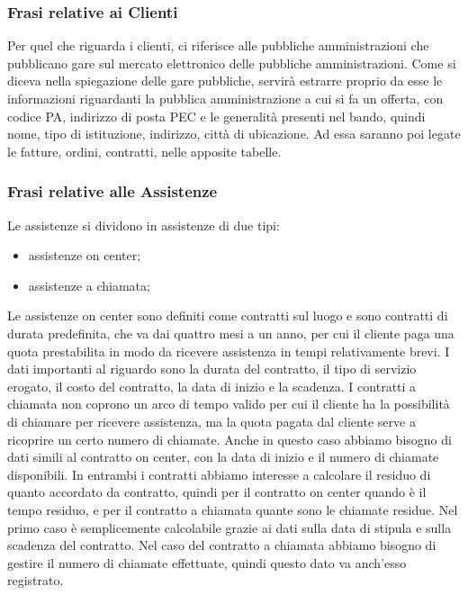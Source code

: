 \subsubsection{Frasi relative ai Clienti}
Per quel che riguarda i clienti, ci riferisce alle pubbliche amministrazioni che pubblicano gare sul mercato elettronico delle pubbliche amministrazioni. Come si diceva nella spiegazione delle gare pubbliche, servirà estrarre proprio da esse le informazioni riguardanti la pubblica amministrazione a cui si fa un offerta, con codice PA, indirizzo di posta PEC e le generalità presenti nel bando, quindi nome, tipo di istituzione, indirizzo, città di ubicazione.\newline
Ad essa saranno poi legate le fatture, ordini, contratti, nelle apposite tabelle.

\subsubsection{Frasi relative alle Assistenze}
Le assistenze si dividono in assistenze di due tipi:
\begin{itemize}
\item	assistenze on center;
\item	assistenze a chiamata;
\end{itemize}
Le assistenze on center sono definiti come contratti sul luogo e sono contratti di durata predefinita, che va dai quattro mesi a un anno, per cui il cliente paga una quota prestabilita in modo da ricevere assistenza in tempi relativamente brevi.\newline
I dati importanti al riguardo sono la durata del contratto, il tipo di servizio erogato, il costo del contratto, la data di inizio e la scadenza.
I contratti a chiamata non coprono un arco di tempo valido per cui il cliente ha la possibilità di chiamare per ricevere assistenza, ma la quota pagata dal cliente serve a ricoprire un certo numero di chiamate. Anche in questo caso abbiamo bisogno di dati simili al contratto on center, con la data di inizio e il numero di chiamate disponibili.\newline
In entrambi i contratti abbiamo interesse a calcolare il residuo di quanto accordato da contratto, quindi per il contratto on center quando è il tempo residuo, e per il contratto a chiamata quante sono le chiamate residue. Nel primo caso è semplicemente calcolabile grazie ai dati sulla data di stipula e sulla scadenza del contratto. Nel caso del contratto a chiamata abbiamo bisogno di gestire il numero di chiamate effettuate, quindi questo dato va anch'esso registrato.

